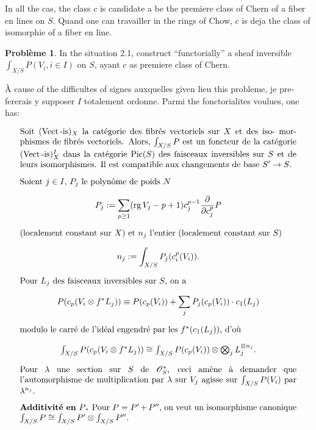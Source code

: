 \documentclass[12pt,a4paper]{article}
\theoremstyle{plain}
\theoremstyle{definition}
\newtheorem{probleme}[theorem]{Probl\`eme}
\DeclareMathOperator{\rank}{rg}
\DeclareMathOperator{\Pic}{Pic}
\DeclareMathOperator{\Vect}{Vect}
\newcommand{\Oo}{\mathscr{O}}
\begin{document}
In all the cas, the class $c$ is candidate a be the premiere class
of Chern of a fiber en lines on $S$. Quand one can travailler in the rings
of Chow, $c$ is deja the class of isomorphie of a fiber en line.

\begin{probleme}
In the situation 2.1, construct ``functorially'' a sheaf
inversible $\int_{X/S} P(V_i, i \in I)$ on $S$, ayant $c$ as premiere class of Chern.
\end{probleme}

\`A cause of the difficultes of signes auxquelles given lieu this probleme, je pre-
fererais y supposer $I$ totalement ordonne. Parmi the fonctorialites voulues,
one has:

\begin{equation}\label{eq:2.1.3}
\parbox{\dimexpr\linewidth-2em}{%
Soit $(\Vect\text{-is})_X$ la cat\'egorie des fibr\'es vectoriels sur $X$ et des iso-
morphismes de fibr\'es vectoriels. Alors, $\int_{X/S} P$ est un foncteur de la cat\'egorie
$(\Vect\text{-is})_X^I$ dans la cat\'egorie $\Pic(S)$ des faisceaux inversibles sur $S$ et de
leurs isomorphismes. Il est compatible aux changements de base $S' \to S$.}
\end{equation}

\begin{equation}\label{eq:2.1.4}
\parbox{\dimexpr\linewidth-2em}{%
Soient $j \in I$, $P_j$ le polyn\^ome de poids $N$
\[
P_j := \sum_{p \geq 1} (\rank V_j - p + 1) c_j^{p-1} \frac{\partial}{\partial c_j^p} P
\]
(localement constant sur $X$) et $n_j$ l'entier (localement constant sur $S$)
\[
n_j := \int_{X/S} P_j(c_i^p(V_i)) .
\]
Pour $L_j$ des faisceaux inversibles sur $S$, on a
\[
P(c_p(V_i \otimes f^* L_j)) \equiv P(c_p(V_i)) + \sum_j P_j(c_p(V_i)) \cdot c_1(L_j)
\]
modulo le carr\'e de l'id\'eal engendr\'e par les $f^*(c_1(L_j))$, d'o\`u
\[
\textstyle \int_{X/S} P(c_p(V_i \otimes f^* L_j)) \cong \int_{X/S} P(c_p(V_i)) \otimes \bigotimes_j L_j^{\otimes n_j} .
\]
Pour $\lambda$ une section sur $S$ de $\Oo_S^*$, ceci am\`ene \`a demander que l'automorphisme
de multiplication par $\lambda$ sur $V_j$ agisse sur $\int_{X/S} P(V_i)$ par $\lambda^{n_j}$.}
\end{equation}

\begin{equation}\label{eq:2.1.5}
\parbox{\dimexpr\linewidth-2em}{%
\textbf{Additivit\'e en $P$.} Pour $P = P' + P''$, on veut un isomorphisme canonique
$\int_{X/S} P \cong \int_{X/S} P' \otimes \int_{X/S} P''$.}
\end{equation}
\end{document}
